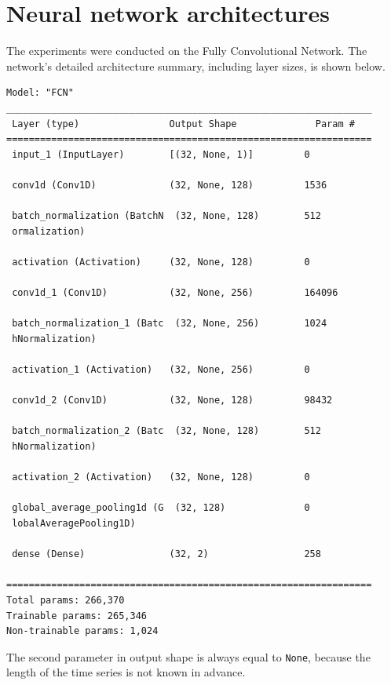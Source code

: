 \documentclass[a4paper,11pt,twoside]{report}
\theoremstyle{definition}
\begin{document}
\section{Neural network architectures}
The experiments were conducted on the Fully Convolutional Network. The network's detailed architecture summary, including layer sizes, is shown below. \begin{verbatim}
Model: "FCN"
_________________________________________________________________
 Layer (type)                Output Shape              Param #
=================================================================
 input_1 (InputLayer)        [(32, None, 1)]         0

 conv1d (Conv1D)             (32, None, 128)         1536

 batch_normalization (BatchN  (32, None, 128)        512
 ormalization)

 activation (Activation)     (32, None, 128)         0

 conv1d_1 (Conv1D)           (32, None, 256)         164096

 batch_normalization_1 (Batc  (32, None, 256)        1024
 hNormalization)

 activation_1 (Activation)   (32, None, 256)         0

 conv1d_2 (Conv1D)           (32, None, 128)         98432

 batch_normalization_2 (Batc  (32, None, 128)        512
 hNormalization)

 activation_2 (Activation)   (32, None, 128)         0

 global_average_pooling1d (G  (32, 128)              0
 lobalAveragePooling1D)

 dense (Dense)               (32, 2)                 258

=================================================================
Total params: 266,370
Trainable params: 265,346
Non-trainable params: 1,024
\end{verbatim}
The second parameter in output shape is always equal to \texttt{None}, because the length of the time series is not known in advance.
\end{document}
